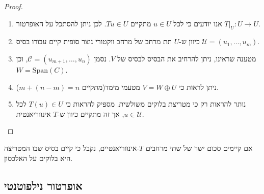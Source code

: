 \documentclass{tstextbook}
\begin{document}
\begin{proof}
  \begin{enumerate}
    \item אנו יודעים כי לכל \(u \in U\) מתקיים \(Tu \in U\). לכן ניתן להסתכל על האופרטור \(T|_{U}:U\to U\). 


    \item כיוון ש-\(U\) תת מרחב של מרחב ווקטורי נוצר סופית קיים עבורו בסיס \(\mathcal{U}=\left( u_{1},\dots, u_{m} \right)\).  


    \item מטענה שראינו, ניתן להרחיב את הבסיס לבסיס של \(V\). נסמן \(\mathcal{C}=\left( u_{m+1},\dots,u_{n} \right)\), וכן \(W=\mathrm{Span}(C)\). 


    \item ניתן לראות כי \(V=W\oplus U\) מטעמי מימד(מתקיים \(m+(n-m)=n\)). 


    \item נותר להראות רק כי מטריצת בלוקים משולשית.  מספיק להראות כי \(T(u)\in U\) לכל \(u \in \mathcal{ U}\), אך זה מתקיים כיוון ש-\(T\) אינווריאנטית. 


  \end{enumerate}
\end{proof}
\begin{corollary}
אם קיימים סכום ישר של שתי מרחבים \(T\)-אינווריאנטיים, נקבל כי קיים בסיס שבו המטריצה היא בלוקים על האלכסון.

\end{corollary}
\subsection{אופרטור נילפוטנטי}
\end{document}
